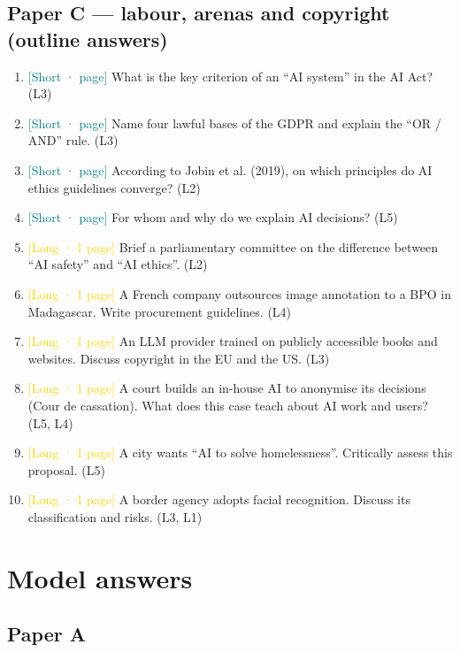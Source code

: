 \documentclass[11pt,a4paper]{article}
\begin{document}
\subsection{Paper C — labour, arenas and copyright (outline answers)}\begin{enumerate}[label=\textbf{Q\arabic*.},leftmargin=2.4em]
\item \textcolor{teal}{[Short · \textonequarter{} page]} What is the key criterion of an “AI system” in the AI Act? {\small\color{gray}(L3)}
\item \textcolor{teal}{[Short · \textonequarter{} page]} Name four lawful bases of the GDPR and explain the “OR / AND” rule. {\small\color{gray}(L3)}
\item \textcolor{teal}{[Short · \textonequarter{} page]} According to Jobin et al. (2019), on which principles do AI ethics guidelines converge? {\small\color{gray}(L2)}
\item \textcolor{teal}{[Short · \textonequarter{} page]} For whom and why do we explain AI decisions? {\small\color{gray}(L5)}
\item \textcolor{gold}{[Long · 1 page]} Brief a parliamentary committee on the difference between “AI safety” and “AI ethics”. {\small\color{gray}(L2)}
\item \textcolor{gold}{[Long · 1 page]} A French company outsources image annotation to a BPO in Madagascar. Write procurement guidelines. {\small\color{gray}(L4)}
\item \textcolor{gold}{[Long · 1 page]} An LLM provider trained on publicly accessible books and websites. Discuss copyright in the EU and the US. {\small\color{gray}(L3)}
\item \textcolor{gold}{[Long · 1 page]} A court builds an in-house AI to anonymise its decisions (Cour de cassation). What does this case teach about AI work and users? {\small\color{gray}(L5, L4)}
\item \textcolor{gold}{[Long · 1 page]} A city wants “AI to solve homelessness”. Critically assess this proposal. {\small\color{gray}(L5)}
\item \textcolor{gold}{[Long · 1 page]} A border agency adopts facial recognition. Discuss its classification and risks. {\small\color{gray}(L3, L1)}
\end{enumerate}
\section{Model answers}\label{sec:ans}
\subsection{Paper A}
\end{document}
